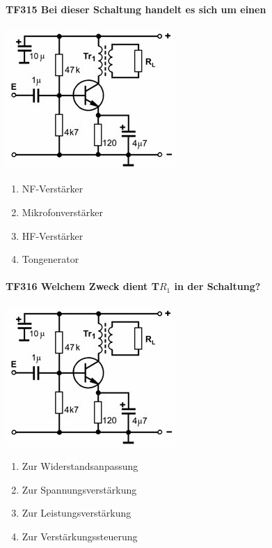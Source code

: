 \documentclass[8pt]{article}
\begin{document}
\paragraph*{TF315 Bei dieser Schaltung handelt es sich um einen}
\begin{center}
	\begin{minipage}{\linewidth}
		\centering
		\includegraphics[scale=1.0]{pics/tf315_a.jpg}
	\end{minipage}
\end{center}
\begin{enumerate}[nolistsep,label=\Alph*]
\item NF-Verstärker
\item Mikrofonverstärker
\item HF-Verstärker
\item Tongenerator
\end{enumerate}

\paragraph*{TF316 Welchem Zweck dient T$R_{1}$ in der Schaltung?}
\begin{center}
	\begin{minipage}{\linewidth}
		\centering
		\includegraphics[scale=1.0]{pics/tf316_a.jpg}
	\end{minipage}
\end{center}
\begin{enumerate}[nolistsep,label=\Alph*]
\item Zur Widerstandsanpassung
\item Zur Spannungsverstärkung
\item Zur Leistungsverstärkung
\item Zur Verstärkungssteuerung
\end{enumerate}
\end{document}
